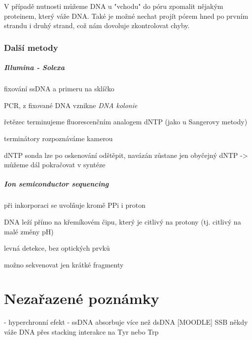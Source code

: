 \documentclass[DIV=8]{scrreprt}
\begin{document}
V případě nutnosti můžeme DNA u "vchodu" do póru zpomalit nějakým proteinem, který váže DNA. Také je možné nechat projít pórem hned po prvním strandu i druhý strand, což nám dovoluje zkontrolovat chyby.

\subsection{Další metody} \label{Další metody}


\paragraph{Illumina - Solexa}
\begin{myItemize}[nosep]
    \item fixování ssDNA a primeru na sklíčko
    \item PCR, z fixované DNA vznikne \emph{DNA kolonie}
    \item řetězec terminujeme fluorescenčním analogem dNTP (jako u Sangerovy metody)
    \item terminátory rozpoznáváme kamerou
    \item dNTP sonda lze po oskenování odštěpit, navázán zůstane jen obyčejný dNTP -> můžeme dál pokračovat v syntéze
\end{myItemize}



\paragraph{Ion semiconductor sequencing}
\begin{myItemize}[nosep]
    \item při inkorporaci se uvolňuje kromě PPi i proton
    \item DNA leží přímo na křemíkovém čipu, který je citlivý na protony (tj. citlivý na malé změny pH)
    \item levná detekce, bez optických prvků
    \item možno sekvenovat jen krátké fragmenty
\end{myItemize}



\chapter{Nezařazené poznámky} \label{Nezařazené poznámky}

- hyperchronní efekt - ssDNA absorbuje více než dsDNA
[MOODLE] SSB někdy váže DNA přes stacking interakce na Tyr nebo Trp
\end{document}
